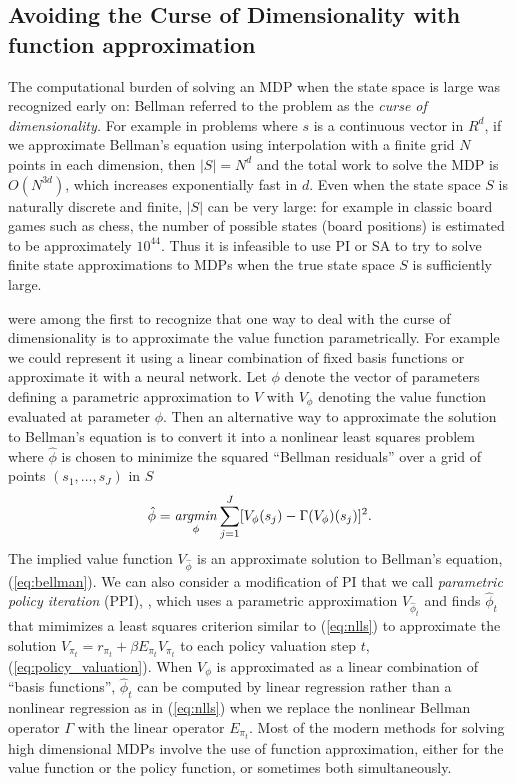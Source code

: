 \subsection{Avoiding the Curse of Dimensionality with function approximation}

The computational burden of solving an MDP when the state space is large was recognized early on: Bellman 
referred to the problem as the {\it curse of dimensionality.\/} For example in problems where $s$ is a continuous vector in $R^d$, 
if we approximate Bellman's equation using interpolation with a finite grid  $N$ points in each dimension, then $|S|=N^d$ and the total
work to solve the MDP is $O(N^{3d})$, which increases exponentially fast in $d$. Even when the state space $S$ is naturally discrete
and finite, $|S|$ can be very large: for example in classic board games such as chess, the number of possible states (board positions)
is estimated to be approximately $10^{44}$. Thus it is infeasible to use PI or SA to try to solve finite
state approximations to MDPs when the true state space $S$ is sufficiently large.

\citet{BD:1959} were among the first to recognize that
one way to deal with the curse of dimensionality is to approximate the value function parametrically. For example we could represent it
using a linear combination of fixed basis functions or approximate it with a neural network. Let $\phi$ denote the vector of parameters defining a 
parametric approximation to $V$ with $V_\phi$ denoting the value function evaluated at parameter $\phi$. Then an alternative way to
approximate the solution to Bellman's equation is to convert it into a nonlinear least squares problem where $\hat\phi$ is chosen
to minimize the squared ``Bellman residuals'' over a grid of points $(s_1,\ldots,s_J)$ in $S$
\begin{equation}
      \hat\phi = \mathop{\it argmin}_{\phi} \sum_{j=1}^J [V_\phi(s_j)- \Gamma(V_\phi)(s_j)]^2.
\label{eq:nlls}
\end{equation}
The implied value function $V_{\hat\phi}$ is an approximate solution to Bellman's equation, (\ref{eq:bellman}).
We can also  consider a modification of PI that we call {\it parametric policy iteration\/} (PPI), \citet{ppi:2000}, 
which uses a parametric approximation $V_{\hat\phi_t}$ and finds $\hat\phi_t$ that mimimizes a least squares criterion
similar to (\ref{eq:nlls}) to approximate the solution $V_{\pi_t}=r_{\pi_t}+\beta E_{\pi_t}V_{\pi_t}$ 
to each policy valuation step $t$, (\ref{eq:policy_valuation}). When $V_\phi$
is approximated as a linear combination of ``basis functions'', $\hat\phi_t$ can be computed by 
linear regression rather than a nonlinear regression as in (\ref{eq:nlls}) when we 
replace the nonlinear Bellman operator $\Gamma$ with the linear operator $E_{\pi_t}$. 
Most of the modern methods for solving high dimensional MDPs involve the use of function approximation, either for the
value function or the policy function, or sometimes both simultaneously. 

